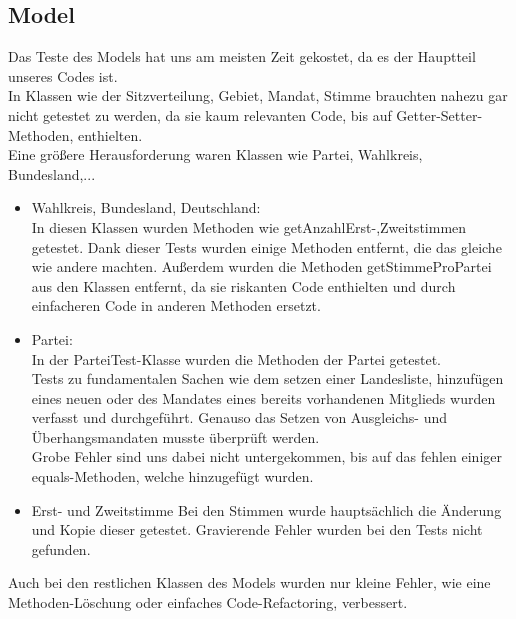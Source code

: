 \documentclass[12pt,a4paper,titlepage]{article}
\begin{document}
\subsection{Model}
Das Teste des Models hat uns am meisten Zeit gekostet, da es der Hauptteil unseres Codes ist.\\
In Klassen wie der Sitzverteilung, Gebiet, Mandat, Stimme brauchten nahezu gar nicht getestet zu werden, da sie kaum relevanten Code, bis auf Getter-Setter-Methoden, enthielten. \\
Eine größere Herausforderung waren Klassen wie Partei, Wahlkreis, Bundesland,...\\
\begin{itemize}
\item Wahlkreis, Bundesland, Deutschland: \\
In diesen Klassen wurden Methoden wie getAnzahlErst-,Zweitstimmen getestet. Dank dieser Tests wurden einige Methoden entfernt, die das gleiche wie andere machten. Außerdem wurden die Methoden getStimmeProPartei aus den Klassen entfernt, da sie riskanten Code enthielten und durch einfacheren Code in anderen Methoden ersetzt.
\item Partei: \\
In der ParteiTest-Klasse wurden die Methoden der Partei getestet. \\
Tests zu fundamentalen Sachen wie dem setzen einer Landesliste, hinzufügen eines neuen oder des Mandates eines bereits vorhandenen Mitglieds wurden verfasst und durchgeführt. Genauso das Setzen von Ausgleichs- und Überhangsmandaten musste überprüft werden.\\
Grobe Fehler sind uns dabei nicht untergekommen, bis auf das fehlen einiger equals-Methoden, welche hinzugefügt wurden.\\
\item Erst- und Zweitstimme
Bei den Stimmen wurde hauptsächlich die Änderung und Kopie dieser getestet. Gravierende Fehler wurden bei den Tests nicht gefunden.\\
\end{itemize}
Auch bei den restlichen Klassen des Models wurden nur kleine Fehler, wie eine Methoden-Löschung oder einfaches Code-Refactoring, verbessert.\\
\end{document}

